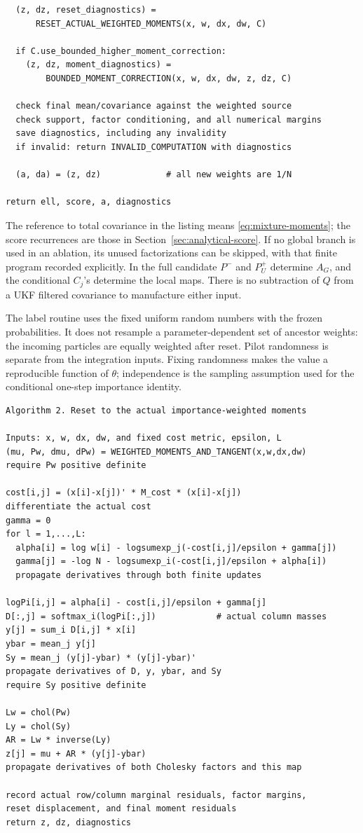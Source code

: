 \documentclass[11pt,a4paper]{article}
\begin{document}
\begin{lstlisting}
  (z, dz, reset_diagnostics) =
      RESET_ACTUAL_WEIGHTED_MOMENTS(x, w, dx, dw, C)

  if C.use_bounded_higher_moment_correction:
    (z, dz, moment_diagnostics) =
        BOUNDED_MOMENT_CORRECTION(x, w, dx, dw, z, dz, C)

  check final mean/covariance against the weighted source
  check support, factor conditioning, and all numerical margins
  save diagnostics, including any invalidity
  if invalid: return INVALID_COMPUTATION with diagnostics

  (a, da) = (z, dz)             # all new weights are 1/N

return ell, score, a, diagnostics
\end{lstlisting}

The reference to total covariance in the listing means
\eqref{eq:mixture-moments}; the score recurrences are those in
Section~\ref{sec:analytical-score}. If no global branch is used in an ablation, its unused
factorizations can be skipped, with that finite program recorded explicitly.
In the full candidate \(P^-\) and \(P_U^+\) determine \(A_G\), and the
conditional \(C_j\)'s determine the local maps. There is no subtraction
of \(Q\) from a UKF filtered covariance to manufacture either input.

The label routine uses the fixed uniform random numbers with the frozen
probabilities. It does not resample a parameter-dependent set of ancestor
weights: the incoming particles are equally weighted after reset.
Pilot randomness is separate from the integration inputs. Fixing randomness
makes the value a reproducible function of \(\theta\); independence is the
sampling assumption used for the conditional one-step importance identity.

\begin{minipage}{\linewidth}
\begin{lstlisting}
Algorithm 2. Reset to the actual importance-weighted moments

Inputs: x, w, dx, dw, and fixed cost metric, epsilon, L
(mu, Pw, dmu, dPw) = WEIGHTED_MOMENTS_AND_TANGENT(x,w,dx,dw)
require Pw positive definite

cost[i,j] = (x[i]-x[j])' * M_cost * (x[i]-x[j])
differentiate the actual cost
gamma = 0
for l = 1,...,L:
  alpha[i] = log w[i] - logsumexp_j(-cost[i,j]/epsilon + gamma[j])
  gamma[j] = -log N - logsumexp_i(-cost[i,j]/epsilon + alpha[i])
  propagate derivatives through both finite updates

logPi[i,j] = alpha[i] - cost[i,j]/epsilon + gamma[j]
D[:,j] = softmax_i(logPi[:,j])            # actual column masses
y[j] = sum_i D[i,j] * x[i]
ybar = mean_j y[j]
Sy = mean_j (y[j]-ybar) * (y[j]-ybar)'
propagate derivatives of D, y, ybar, and Sy
require Sy positive definite

Lw = chol(Pw)
Ly = chol(Sy)
AR = Lw * inverse(Ly)
z[j] = mu + AR * (y[j]-ybar)
propagate derivatives of both Cholesky factors and this map

record actual row/column marginal residuals, factor margins,
reset displacement, and final moment residuals
return z, dz, diagnostics
\end{lstlisting}
\end{minipage}
\end{document}
